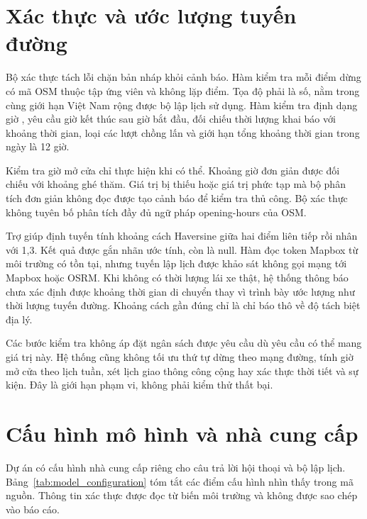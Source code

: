 \section{Xác thực và ước lượng tuyến đường}

Bộ xác thực tách lỗi chặn bản nháp khỏi cảnh báo. Hàm kiểm tra mỗi điểm dừng có mã OSM thuộc tập ứng viên và không lặp điểm. Tọa độ phải là số, nằm trong cùng giới hạn Việt Nam rộng được bộ lập lịch sử dụng. Hàm kiểm tra định dạng giờ , yêu cầu giờ kết thúc sau giờ bắt đầu, đối chiếu thời lượng khai báo với khoảng thời gian, loại các lượt chồng lấn và giới hạn tổng khoảng thời gian trong ngày là 12 giờ.

Kiểm tra giờ mở cửa chỉ thực hiện khi có thể. Khoảng giờ đơn giản được đối chiếu với khoảng ghé thăm. Giá trị bị thiếu hoặc giá trị phức tạp mà bộ phân tích đơn giản không đọc được tạo cảnh báo để kiểm tra thủ công. Bộ xác thực không tuyên bố phân tích đầy đủ ngữ pháp opening-hours của OSM.

Trợ giúp định tuyến tính khoảng cách Haversine giữa hai điểm liên tiếp rồi nhân với 1,3. Kết quả được gắn nhãn ước tính, còn  là null. Hàm đọc token Mapbox từ môi trường có tồn tại, nhưng tuyến lập lịch được khảo sát không gọi mạng tới Mapbox hoặc OSRM. Khi không có thời lượng lái xe thật, hệ thống thông báo chưa xác định được khoảng thời gian di chuyển thay vì trình bày ước lượng như thời lượng tuyến đường. Khoảng cách gần đúng chỉ là chỉ báo thô về độ tách biệt địa lý.

Các bước kiểm tra không áp đặt ngân sách được yêu cầu dù yêu cầu có thể mang giá trị này. Hệ thống cũng không tối ưu thứ tự dừng theo mạng đường, tính giờ mở cửa theo lịch tuần, xét lịch giao thông công cộng hay xác thực thời tiết và sự kiện. Đây là giới hạn phạm vi, không phải kiểm thử thất bại.

\section{Cấu hình mô hình và nhà cung cấp}

Dự án có cấu hình nhà cung cấp riêng cho câu trả lời hội thoại và bộ lập lịch. Bảng~\ref{tab:model_configuration} tóm tắt các điểm cấu hình nhìn thấy trong mã nguồn. Thông tin xác thực được đọc từ biến môi trường và không được sao chép vào báo cáo.

